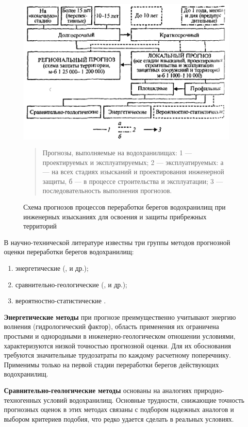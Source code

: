 \documentclass[732,fontsize=14pt,final]{studrep}
\begin{document}
  \begin{figure}[htp]
	\begin{center}
	\includegraphics[width=0.8\linewidth]{pics/image4.png}
  \end{center}
  \begin{quote}  
    Прогнозы, выполняемые на водохранилищах: 1 — проектируемых и эксплуатируемых; 2 — эксплуатируемых: а — на всех стадиях изысканий и проектирования инженерной защиты, б — в процессе строительства и эксплуатации; 3 — последовательность выполнения прогнозов.
  \end{quote}
  \caption{Схема прогнозов процессов переработки берегов водохранилищ при инженерных изысканиях для освоения и защиты прибрежных территорий~\cite{rec86}}
    \label{fig:prognosys-schema}
  \end{figure}

В научно-технической литературе известны три группы методов прогнозной оценки переработки берегов водохранилищ:
\begin{enumerate}
\item энергетические (\cite{b22}, \cite{b23} и др.);
\item сравнительно-геологические (\cite{b18}, \cite{b19} и др.);
\item вероятностно-статистические \cite{b20}.
\end{enumerate}

\textbf{Энергетические методы} при прогнозе преимущественно учитывают энергию волнения (гидрологический фактор), область применения их ограничена простыми и однородными в инженерно-геологическом отношении условиями, характеризуются низкой точностью прогнозной оценки. Для их обоснования требуются значительные трудозатраты по каждому расчетному поперечнику. Применимы только на первой стадии переработки берегов действующих водохранилищ.

\textbf{Сравнительно-геологические методы}  основаны на аналогиях природно-техногенных условий водохранилищ. Основные трудности, снижающие точность прогнозных оценок в этих методах связаны с подбором надежных аналогов и выбором критериев подобия, что редко удается сделать в реальных условиях.
\end{document}
